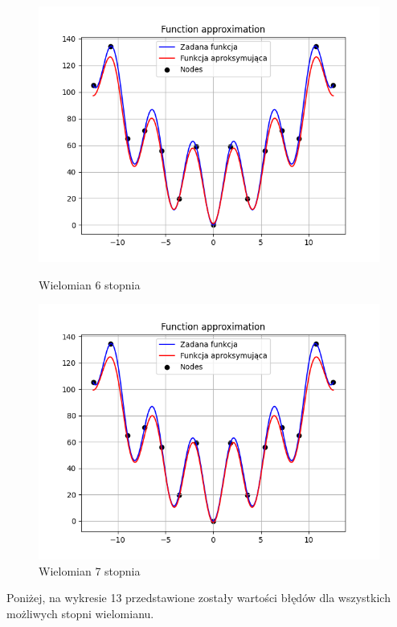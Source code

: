 \documentclass{article}
\begin{document}
\begin{figure}[H]
\begin{minipage}[b]{0.49\textwidth}
    \begin{minipage}[b]{\textwidth}
      \includegraphics[width=\textwidth]{img11.png}
      \caption{Wielomian 6 stopnia}
    \end{minipage}
    \vspace*{\fill}
    \begin{minipage}[b]{\textwidth}
      \includegraphics[width=\textwidth]{img12.png}
      \caption{Wielomian 7 stopnia}
    \end{minipage}
  \end{minipage}
\end{figure}

\noindent
Poniżej, na wykresie 13 przedstawione zostały wartości błędów dla wszystkich możliwych stopni wielomianu.
\end{document}
